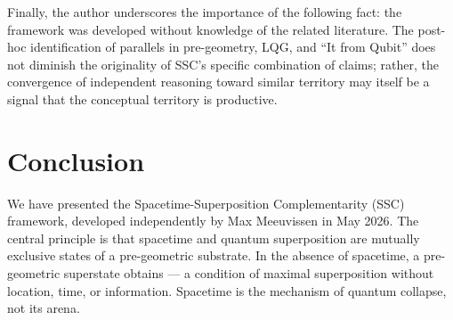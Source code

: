 \documentclass[12pt,a4paper]{article}
\begin{document}
Finally, the author underscores the importance of the following fact:
the framework was developed without knowledge of the related literature.
The post-hoc identification of parallels in pre-geometry, LQG, and
``It from Qubit'' does not diminish the originality of SSC's specific
combination of claims; rather, the convergence of independent reasoning
toward similar territory may itself be a signal that the conceptual
territory is productive.

\section{Conclusion}
\label{sec:conclusion}

We have presented the Spacetime-Superposition Complementarity (SSC)
framework, developed independently by Max Meeuvissen in May 2026.  The
central principle is that spacetime and quantum superposition are
mutually exclusive states of a pre-geometric substrate.  In the absence
of spacetime, a pre-geometric superstate obtains — a condition of
maximal superposition without location, time, or information.  Spacetime
is the mechanism of quantum collapse, not its arena.
\end{document}
